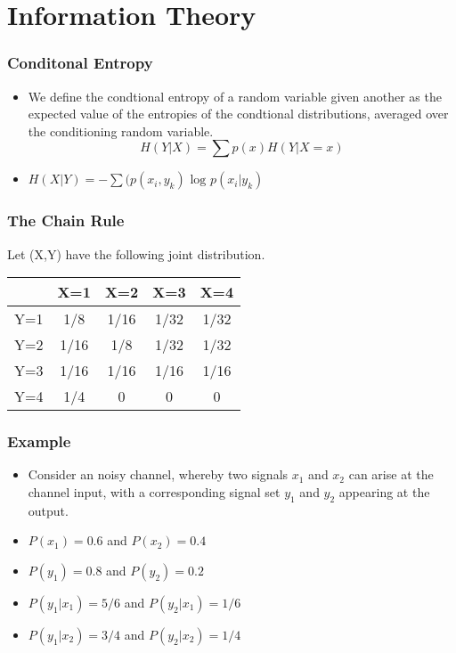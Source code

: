 \section{Information Theory}


\begin{frame}
\frametitle{Conditonal Entropy}
\begin{itemize}
\item We define the condtional entropy of a random variable given another as the expected value of the entropies of the condtional distributions, averaged over the conditioning random variable.
\[ H(Y|X) = \sum p(x)H(Y|X=x) \]
\item $H(X|Y) = -\sum ( p(x_i,y_k)\mbox{ log }p(x_i|y_k)$
\end{itemize}
\end{frame}




\begin{frame}

\frametitle{The Chain Rule}
Let (X,Y) have the following joint distribution.
\begin{center}
\begin{tabular}{|c||c|c|c|c|}\hline
& X=1 &X=2 &X=3 &X=4 \\ \hline \hline
Y=1& 1/8  & 1/16 & 1/32 & 1/32 \\ \hline
Y=2& 1/16 & 1/8  & 1/32 & 1/32 \\ \hline
Y=3& 1/16 & 1/16 & 1/16 & 1/16 \\ \hline
Y=4& 1/4  & 0       & 0       & 0 \\ \hline
\end{tabular}
\end{center}

\end{frame}

\begin{frame}
\frametitle{Example}
\begin{itemize}
\item Consider an noisy channel,  whereby two signals $x_1$ and $x_2$ can arise at the channel input, with a corresponding signal set $y_1$ and $y_2$ appearing at the output.
\item $P(x_1) = 0.6$ and $P(x_2) = 0.4$
\item $P(y_1)= 0.8$ and $P(y_2) = 0.2$
\item $P(y_1|x_1) = 5/6$ and  $P(y_2|x_1) = 1/6$
\item $P(y_1|x_2) = 3/4$ and  $P(y_2|x_2) = 1/4$
\end{itemize}
\end{frame}

